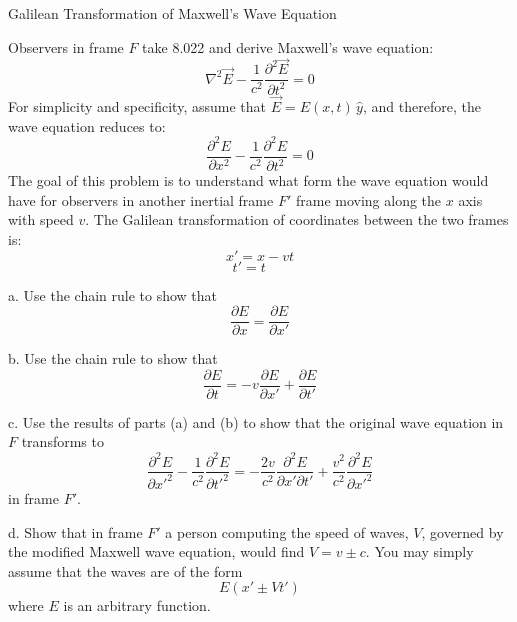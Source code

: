 \documentclass[makesolutionspdf]{esg8022pset}
\begin{document}
\begin{problem}{Galilean Transformation of Maxwell's Wave Equation}

Observers in frame $F$ take 8.022 and derive Maxwell's wave equation:
$$\nabla^2\vec{E} - \frac{1}{c^2} \frac{\partial^2\vec{E}}{\partial t^2} = 0$$
For simplicity and specificity, assume that $\vec{E} = E(x,t)\, \hat{y}$, and therefore, the wave equation reduces to:
$$\frac{\partial^2E}{\partial x^2} - \frac{1}{c^2} \frac{\partial^2E}{\partial t^2} = 0$$
The goal of this problem is to understand what form the wave equation would have for observers in another inertial frame $F'$ frame moving along the $x$ axis with speed $v$.  The Galilean transformation of coordinates between the two frames is:
$$x' = x - vt$$
$$t' = t~~~~~~~$$


\noindent
a. Use the chain rule to show that
$$\frac{\partial E}{\partial x} = \frac{\partial E}{\partial x'}$$


\noindent
b. Use the chain rule to show that
$$\frac{\partial E}{\partial t} = -v \frac{\partial E}{\partial x'} + \frac{\partial E}{\partial t'}$$


\noindent
c. Use the results of parts (a) and (b) to show that the original wave equation in $F$ transforms to
$$\frac{\partial^2E}{\partial x'^2} - \frac{1}{c^2} \frac{\partial^2E}{\partial t'^2} = -\frac{2v}{c^2} \frac{\partial^2E}{\partial x' \partial t'} + \frac{v^2}{c^2} \frac{\partial^2E}{\partial x'^2}$$
in frame $F'$.


\noindent
d. Show that in frame $F'$ a person computing the speed of waves, $V$, governed by the modified Maxwell wave equation, would find $V = v \pm c$.  You may simply assume that the waves are of the form
$$E(x' \pm Vt')$$
where $E$ is an arbitrary function.

\end{problem}
\end{document}
